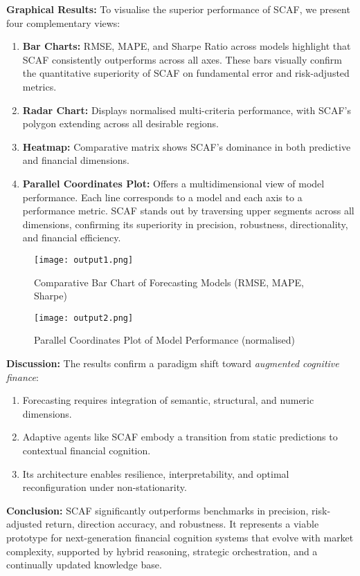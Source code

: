 \documentclass[conference]{IEEEtran}
\begin{document}
\textbf{Graphical Results:}
To visualise the superior performance of SCAF, we present four complementary views:
\begin{enumerate}
    \item \textbf{Bar Charts:} RMSE, MAPE, and Sharpe Ratio across models highlight that SCAF consistently outperforms across all axes. These bars visually confirm the quantitative superiority of SCAF on fundamental error and risk-adjusted metrics.
    \item \textbf{Radar Chart:} Displays normalised multi-criteria performance, with SCAF's polygon extending across all desirable regions.
    \item \textbf{Heatmap:} Comparative matrix shows SCAF’s dominance in both predictive and financial dimensions.
    \item \textbf{Parallel Coordinates Plot:} Offers a multidimensional view of model performance. Each line corresponds to a model and each axis to a performance metric. SCAF stands out by traversing upper segments across all dimensions, confirming its superiority in precision, robustness, directionality, and financial efficiency.
\end{enumerate}

\begin{figure*}[!h]
    \centering
    \texttt{[image: output1.png]}
    \caption{Comparative Bar Chart of Forecasting Models (RMSE, MAPE, Sharpe)}
\end{figure*}

\begin{figure*}[!h]
    \centering
    \texttt{[image: output2.png]}
    \caption{Parallel Coordinates Plot of Model Performance (normalised)}
\end{figure*}

\textbf{Discussion:}
The results confirm a paradigm shift toward \emph{augmented cognitive finance}:
\begin{enumerate}
    \item Forecasting requires integration of semantic, structural, and numeric dimensions.
    \item Adaptive agents like SCAF embody a transition from static predictions to contextual financial cognition.
    \item Its architecture enables resilience, interpretability, and optimal reconfiguration under non-stationarity.
\end{enumerate}

\textbf{Conclusion:}
SCAF significantly outperforms benchmarks in precision, risk-adjusted return, direction accuracy, and robustness. It represents a viable prototype for next-generation financial cognition systems that evolve with market complexity, supported by hybrid reasoning, strategic orchestration, and a continually updated knowledge base.
\end{document}
